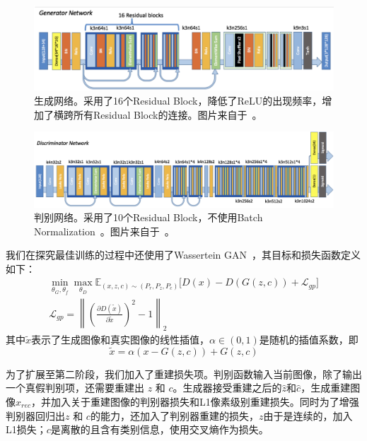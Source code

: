 \documentclass[a4paper,12pt,UTF8]{ctexart}
\newcommand{\norm}[1]{\left\lVert#1\right\rVert}
\newcommand{\kai}{\CJKfamily{zhkai}}	%
\begin{document}
\begin{figure}[H]
  \centering
  \includegraphics[width=1\linewidth]{figs/g_net_moe.png}
  \caption{\kai 生成网络。采用了16个Residual Block，降低了ReLU的出现频率，增加了横跨所有Residual Block的连接。图片来自于~\cite{Jin2017Towards}。}
  \label{fig:generator}
\end{figure}
\begin{figure}[H]
  \centering
  \includegraphics[width=1\linewidth]{figs/mod_disc.png}
  \caption{\kai 判别网络。采用了10个Residual Block，不使用Batch Normalization~\cite{ioffe2015batch}。图片来自于~\cite{Jin2017Towards}。}
  \label{fig:discriminator}
\end{figure}

我们在探究最佳训练的过程中还使用了Wassertein GAN~\cite{2017arXiv170107875A}，其目标和损失函数定义如下：
%
\begin{align}
  \min_{\theta_G,\theta_f} \max_{\theta_D} \mathbb{E}_{(x, z, c) \sim (P_r, P_z, P_c)} \Big[ D(x) - D(G(z, c)) + \mathcal{L}_{gp} \Big] \\
  \mathcal{L}_{gp} = \norm{\left(\frac{\partial D(\tilde x)}{\partial \tilde x}\right)^2 - 1 }_2
\end{align}
%
其中$\tilde x$表示了生成图像和真实图像的线性插值，$\alpha \in (0, 1)$是随机的插值系数，即
%
\begin{equation}
  \tilde x = \alpha (x - G(z, c)) + G(z, c)
\end{equation}

为了扩展至第二阶段，我们加入了重建损失项。判别函数输入当前图像，除了输出一个真假判别项，还需要重建出 $z$ 和 $c$。生成器接受重建之后的$\hat z$和$\hat c$，生成重建图像$x_{rec}$，并加入关于重建图像的判别器损失和L1像素级别重建损失。同时为了增强判别器回归出$z$ 和 $c$的能力，还加入了判别器重建的损失，$z$由于是连续的，加入L1损失；$c$是离散的且含有类别信息，使用交叉熵作为损失。
\end{document}
